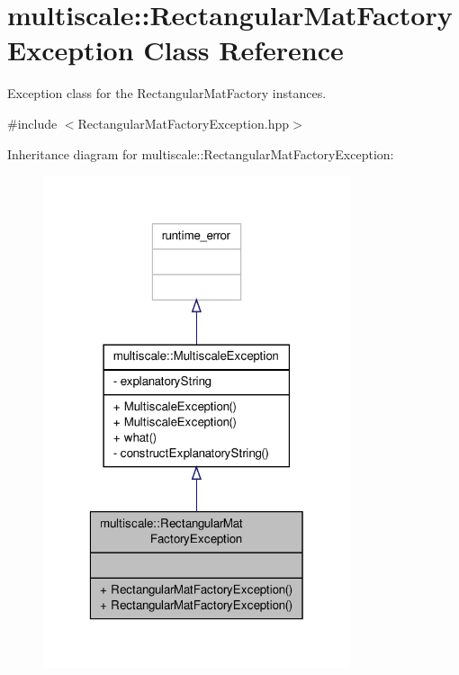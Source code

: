 \hypertarget{classmultiscale_1_1RectangularMatFactoryException}{\section{multiscale\-:\-:Rectangular\-Mat\-Factory\-Exception Class Reference}
\label{classmultiscale_1_1RectangularMatFactoryException}
}


Exception class for the Rectangular\-Mat\-Factory instances.  




{\ttfamily \#include $<$Rectangular\-Mat\-Factory\-Exception.\-hpp$>$}



Inheritance diagram for multiscale\-:\-:Rectangular\-Mat\-Factory\-Exception\-:\nopagebreak
\begin{figure}[H]
\begin{center}
\leavevmode
\includegraphics[width=256pt]{classmultiscale_1_1RectangularMatFactoryException__inherit__graph}
\end{center}
\end{figure}


